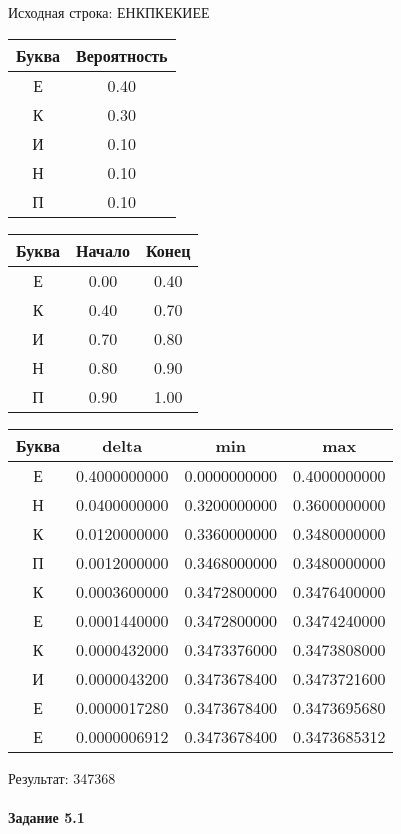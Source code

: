 \documentclass[a4paper, 12pt]{article}
\begin{document}
Исходная строка: ЕНКПКЕКИЕЕ\
\begin{center}
 \begin{tabular}{ |c|c| } 
  \hline
     Буква & Вероятность \\ \hline
Е & 0.40\\\hline
К & 0.30\\\hline
И & 0.10\\\hline
Н & 0.10\\\hline
П & 0.10
\\ \hline \end{tabular}
\end{center}
\begin{center}
 \begin{tabular}{ |c|c|c| } 
  \hline
     Буква & Начало & Конец \\ \hline
Е & 0.00 & 0.40\\\hline
К & 0.40 & 0.70\\\hline
И & 0.70 & 0.80\\\hline
Н & 0.80 & 0.90\\\hline
П & 0.90 & 1.00
\\ \hline \end{tabular}
\end{center}
\begin{center}
 \begin{tabular}{ |c|c|c|c| } 
  \hline
     Буква & delta & min & max \\ \hline
Е & 0.4000000000 & 0.0000000000 & 0.4000000000\\\hline
Н & 0.0400000000 & 0.3200000000 & 0.3600000000\\\hline
К & 0.0120000000 & 0.3360000000 & 0.3480000000\\\hline
П & 0.0012000000 & 0.3468000000 & 0.3480000000\\\hline
К & 0.0003600000 & 0.3472800000 & 0.3476400000\\\hline
Е & 0.0001440000 & 0.3472800000 & 0.3474240000\\\hline
К & 0.0000432000 & 0.3473376000 & 0.3473808000\\\hline
И & 0.0000043200 & 0.3473678400 & 0.3473721600\\\hline
Е & 0.0000017280 & 0.3473678400 & 0.3473695680\\\hline
Е & 0.0000006912 & 0.3473678400 & 0.3473685312
\\ \hline \end{tabular}
\end{center}
Результат: 347368
\pagebreak
\paragraph{Задание 5.1 \\
}
\end{document}
